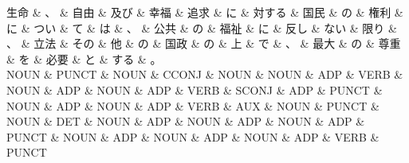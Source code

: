 \documentclass[tikz,border=5pt]{standalone}
\begin{document}
\small
\begin{dependency}[edge unit distance=12.0pt]
    \begin{deptext}[column sep=0.5em]
        生命 \& 、 \& 自由 \& 及び \& 幸福 \& 追求 \& に \& 対する \& 国民 \& の \& 権利 \& に \& つい \& て \& は \& 、 \& 公共 \& の \& 福祉 \& に \& 反し \& ない \& 限り \& 、 \& 立法 \& その \& 他 \& の \& 国政 \& の \& 上 \& で \& 、 \& 最大 \& の \& 尊重 \& を \& 必要 \& と \& する \& 。\\
        NOUN \& PUNCT \& NOUN \& CCONJ \& NOUN \& NOUN \& ADP \& VERB \& NOUN \& ADP \& NOUN \& ADP \& VERB \& SCONJ \& ADP \& PUNCT \& NOUN \& ADP \& NOUN \& ADP \& VERB \& AUX \& NOUN \& PUNCT \& NOUN \& DET \& NOUN \& ADP \& NOUN \& ADP \& NOUN \& ADP \& PUNCT \& NOUN \& ADP \& NOUN \& ADP \& NOUN \& ADP \& VERB \& PUNCT\\
    \end{deptext}
\end{dependency}
\end{document}
